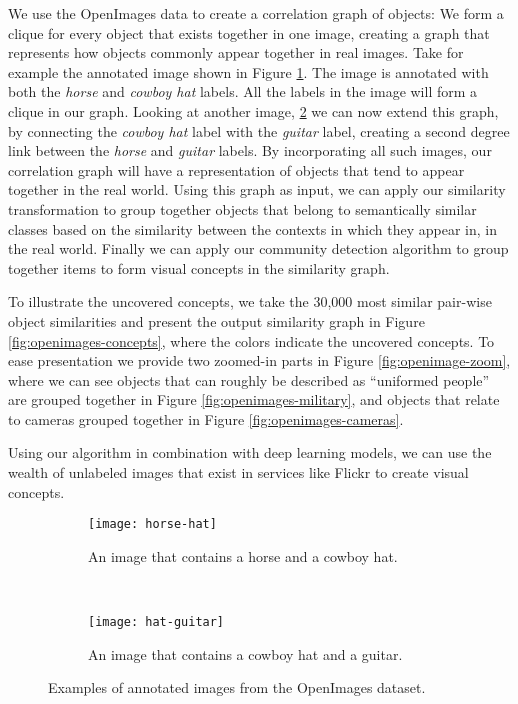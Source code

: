 We use the OpenImages data to create a correlation graph of objects: We form
a clique for every object that exists together in one image, creating a graph that represents
how objects commonly appear together in real images. Take for example the annotated
image shown in Figure \ref{fig:horse-hat}. The image is annotated with both the
\emph{horse} and \emph{cowboy hat} labels. All the labels in the image will form
a clique in our graph. Looking at another image, \ref{fig:hat-guitar} we can now
extend this graph, by connecting the \emph{cowboy hat} label with the \emph{guitar}
label, creating a second degree link between the \emph{horse} and \emph{guitar} labels.
By incorporating all such images, our correlation graph will have a representation of objects
that tend to appear together in the real world. Using this graph as input, we can apply our similarity
transformation to group together objects that belong to semantically similar classes
based on the similarity between the contexts in which they appear in, in the real world.
Finally we can apply our community detection algorithm to group together items to form
visual concepts in the similarity graph.

To illustrate the uncovered concepts, we take the 30,000 most similar
pair-wise object similarities and present the output similarity graph in Figure \ref{fig:openimages-concepts}, where the colors indicate the uncovered concepts.
To ease presentation we provide two zoomed-in parts in Figure \ref{fig:openimage-zoom},
where we can see objects that can roughly be described as ``uniformed people'' are grouped
together in Figure \ref{fig:openimages-military}, and objects that relate to cameras
grouped together in Figure \ref{fig:openimages-cameras}.

Using our algorithm in combination with deep learning models, we can use the wealth of unlabeled
images that exist in services like Flickr to create visual concepts.

\begin{figure}
	\centering
	\begin{subfigure}{\textwidth}
		\centering
		\texttt{[image: horse-hat]}
		\caption{An image that contains a horse and a cowboy hat.}
		\label{fig:horse-hat}
	\end{subfigure}
	~ %
	\begin{subfigure}{\textwidth}
		\centering
		\texttt{[image: hat-guitar]}
		\caption{An image that contains a cowboy hat and a guitar.}
		\label{fig:hat-guitar}
	\end{subfigure}
	\caption{Examples of annotated images from the OpenImages dataset.}
	\label{fig:openimage-examples}
\end{figure}

